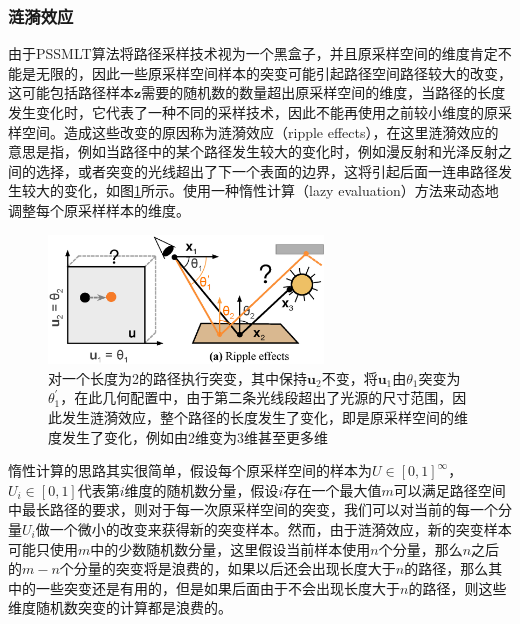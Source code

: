 \subsubsection{涟漪效应}
由于PSSMLT算法将路径采样技术视为一个黑盒子，并且原采样空间的维度肯定不能是无限的，因此一些原采样空间样本的突变可能引起路径空间路径较大的改变，这可能包括路径样本$\mathbf{z}$需要的随机数的数量超出原采样空间的维度，当路径的长度发生变化时，它代表了一种不同的采样技术，因此不能再使用之前较小维度的原采样空间。造成这些改变的原因称为涟漪效应（ripple effects），在这里涟漪效应的意思是指，例如当路径中的某个路径发生较大的变化时，例如漫反射和光泽反射之间的选择，或者突变的光线超出了下一个表面的边界，这将引起后面一连串路径发生较大的变化，如图\ref{f:mlt-ripple-effects}所示。\cite{a:ASimpleandRobustMutationStrategyfortheMetropolisLightTransportAlgorithm}使用一种惰性计算（lazy evaluation）方法来动态地调整每个原采样样本的维度。

\begin{figure}
	\sidecaption
	\includegraphics[width=0.65\textwidth]{figures/mlt/ripple-effects}
	\caption{对一个长度为2的路径执行突变，其中保持$\mathbf{u}_2$不变，将$\mathbf{u}_1$由$\theta_1$突变为$\theta^{'}_1$，在此几何配置中，由于第二条光线段超出了光源的尺寸范围，因此发生涟漪效应，整个路径的长度发生了变化，即是原采样空间的维度发生了变化，例如由2维变为3维甚至更多维}
	\label{f:mlt-ripple-effects}
\end{figure}

惰性计算的思路其实很简单，假设每个原采样空间的样本为$U\in[0,1]^{\infty}$，$U_i\in[0,1]$代表第$i$维度的随机数分量，假设$i$存在一个最大值$m$可以满足路径空间中最长路径的要求，则对于每一次原采样空间的突变，我们可以对当前的每一个分量$U_i$做一个微小的改变来获得新的突变样本。然而，由于涟漪效应，新的突变样本可能只使用$m$中的少数随机数分量，这里假设当前样本使用$n$个分量，那么$n$之后的$m-n$个分量的突变将是浪费的，如果以后还会出现长度大于$n$的路径，那么其中的一些突变还是有用的，但是如果后面由于不会出现长度大于$n$的路径，则这些维度随机数突变的计算都是浪费的。

